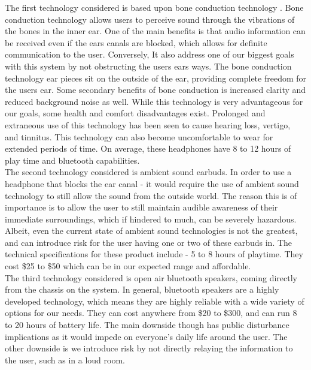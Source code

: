 \noindent The first technology considered is based upon bone conduction technology \cite{BoneConductionRef}. Bone conduction technology allows users to perceive sound through the vibrations of the bones in the inner ear. One of the main benefits is that audio information can be received even if the ears canals are blocked, which allows for definite communication to the user. Conversely, It also address one of our biggest goals with this system by not obstructing the users ears ways. The bone conduction technology ear pieces sit on the outside of the ear, providing complete freedom for the users ear. Some secondary benefits of bone conduction is increased clarity and reduced background noise as well. While this technology is very advantageous for our goals, some health and comfort disadvantages exist. Prolonged and extraneous use of this technology has been seen to cause hearing loss, vertigo, and tinnitus. This technology can also become uncomfortable to wear for extended periods of time. On average, these headphones have 8 to 12 hours of play time and bluetooth capabilities.  \\

\noindent The second technology considered is ambient sound earbuds. In order to use a headphone that blocks the ear canal - it would require the use of ambient sound technology to still allow the sound from the outside world. The reason this is of importance is to allow the user to still maintain audible awareness of their immediate surroundings, which if hindered to much, can be severely hazardous. Albeit, even the current state of ambient sound technologies is not the greatest, and can introduce risk for the user having one or two of these earbuds in. The technical  specifications for these product include - 5 to 8 hours of playtime. They cost \$25 to \$50 which can be in our expected range and affordable. \\

\noindent The third technology considered is open air bluetooth speakers, coming directly from the chassis on the system. In general, bluetooth speakers are a highly developed technology, which means they are highly reliable with a wide variety of options for our needs. They can cost anywhere from \$20 to \$300, and can run 8 to 20 hours of battery life. The main downside though has public disturbance implications as it would impede on everyone's daily life around the user. The other downside is we introduce risk by not directly relaying the information to the user, such as in a loud room. \\


